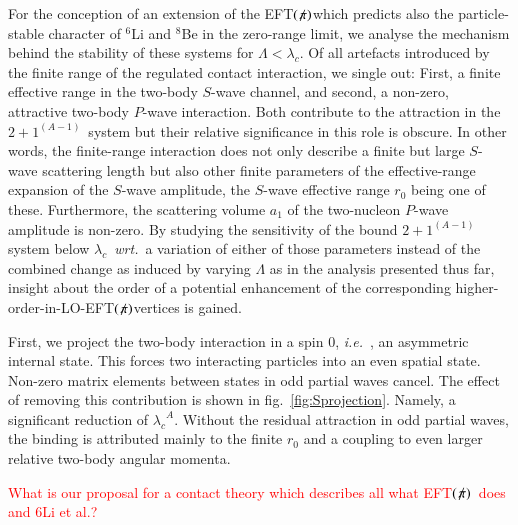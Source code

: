 \documentclass[preprint,12pt]{elsarticle}
\newcommand{\lc}{\ensuremath{\lambda_c}}
\newcommand{\abb}{\ensuremath{2\!+\!1^{(A-1)}}}
\newcommand{\red}[1]{\textcolor{red}{#1}}
\newcommand{\wrt}{\textit{wrt.}~}
\newcommand{\ie}{\textit{i.e.}~}
\newcommand{\eftnopi}{\mbox{EFT$(\not \! \pi)$}}
\newcommand{\figref}[1]{fig.~\ref{#1}}
\begin{document}
For the conception of an extension of the \eftnopi which predicts also the particle-stable character of
$^6$Li and $^8$Be in the zero-range limit, we analyse the mechanism behind the stability of these
systems for $\Lambda<\lc$. Of all artefacts introduced by the finite range of the regulated contact interaction,
we single out: First, a finite effective range in the two-body $S$-wave channel, and second, a non-zero, attractive
two-body $P$-wave interaction. Both contribute to the attraction in the \abb~system but their relative
significance in this role is obscure.
In other words, the finite-range interaction does not only describe a finite but large $S$-wave scattering length
but also other finite parameters of the effective-range expansion of the $S$-wave amplitude, the $S$-wave
effective range $r_0$ being one of these. Furthermore, the scattering volume $a_1$ of the two-nucleon $P$-wave amplitude is
non-zero.
By studying the sensitivity of the bound \abb system below \lc~\wrt a variation of either of those
parameters instead of the combined change as induced by varying $\Lambda$ as in the analysis presented thus far,
insight about the order of a potential enhancement of the corresponding higher-order-in-LO-\eftnopi vertices 
is gained.

First, we project the two-body interaction in a spin 0, \ie, an asymmetric internal state.
This forces two interacting particles into an even spatial state. Non-zero matrix elements between states
in odd partial waves cancel.
The effect of removing this contribution is shown in \figref{fig:Sprojection}. Namely, a significant
reduction of $\lc^A$. 
Without the residual attraction in odd partial waves, the binding is attributed mainly to the finite $r_0$ and
a coupling to even larger relative two-body angular momenta.

\red{What is our proposal for a contact theory which describes all what \eftnopi~does and 6Li et al.?}
\end{document}
